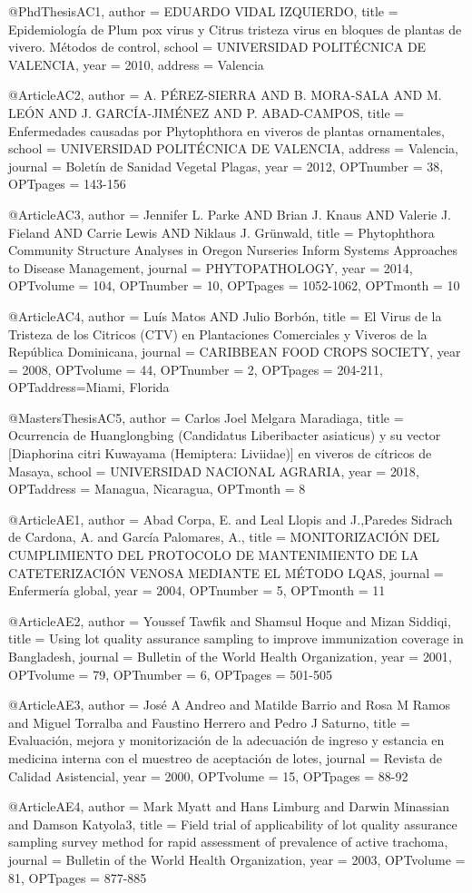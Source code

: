 @PhdThesis{AC1,
author = {EDUARDO VIDAL IZQUIERDO},
title = {Epidemiología de Plum pox virus y Citrus tristeza virus en bloques de plantas de vivero. Métodos de control},
school = {UNIVERSIDAD POLITÉCNICA DE VALENCIA},
year = {2010},
address = {Valencia}
}

@Article{AC2,
author = {A. PÉREZ-SIERRA AND B. MORA-SALA AND M. LEÓN AND J. GARCÍA-JIMÉNEZ AND P. ABAD-CAMPOS},
title = {Enfermedades causadas por Phytophthora en viveros de plantas ornamentales},
school = {UNIVERSIDAD POLITÉCNICA DE VALENCIA},
address = {Valencia},
journal = {Boletín de Sanidad Vegetal Plagas},
year = {2012},
OPTnumber = {38},
OPTpages = {143-156}
}

@Article{AC3,
author = {Jennifer L. Parke AND Brian J. Knaus AND Valerie J. Fieland AND Carrie Lewis AND Niklaus J. Grünwald},
title = {Phytophthora Community Structure Analyses in Oregon Nurseries Inform Systems Approaches to Disease Management},
journal = {PHYTOPATHOLOGY},
year = {2014},
OPTvolume = {104},
OPTnumber = {10},
OPTpages = {1052-1062},
OPTmonth = {10}
}

@Article{AC4,
author = {Luís Matos AND Julio Borbón},
title = {El Virus de la Tristeza de los Citricos (CTV) en Plantaciones Comerciales y Viveros de la República Dominicana},
journal = {CARIBBEAN FOOD CROPS SOCIETY},
year = {2008},
OPTvolume = {44},
OPTnumber = {2},
OPTpages = {204-211},
OPTaddress={Miami, Florida}
}

@MastersThesis{AC5,
author = {Carlos Joel Melgara Maradiaga},
title = {Ocurrencia de Huanglongbing (Candidatus Liberibacter asiaticus) y su vector [Diaphorina citri Kuwayama (Hemiptera: Liviidae)] en viveros de cítricos de Masaya},
school = {UNIVERSIDAD NACIONAL AGRARIA},
year = {2018},
OPTaddress = {Managua, Nicaragua},
OPTmonth = {8}
}

@Article{AE1,
author = {Abad Corpa, E. and Leal Llopis and J.,Paredes Sidrach de Cardona, A. and García Palomares, A.},
title = {MONITORIZACIÓN DEL CUMPLIMIENTO DEL PROTOCOLO DE MANTENIMIENTO DE LA CATETERIZACIÓN VENOSA MEDIANTE EL MÉTODO LQAS},
journal = {Enfermería global},
year = {2004},
OPTnumber = {5},
OPTmonth = {11}
}

@Article{AE2,
author = {Youssef Tawfik and Shamsul Hoque and Mizan Siddiqi},
title = {Using lot quality assurance sampling to improve immunization coverage in Bangladesh},
journal = {Bulletin of the World Health Organization},
year = {2001},
OPTvolume = {79},
OPTnumber = {6},
OPTpages = {501-505}
}

@Article{AE3,
author = {José A Andreo and Matilde Barrio and Rosa M Ramos and Miguel Torralba and Faustino Herrero and Pedro J Saturno},
title = {Evaluación, mejora y monitorización de la adecuación de ingreso y estancia en medicina interna con el muestreo de aceptación de lotes},
journal = {Revista de Calidad Asistencial},
year = {2000},
OPTvolume = {15},
OPTpages = {88-92}
}

@Article{AE4,
author = {Mark Myatt and Hans Limburg and Darwin Minassian and Damson Katyola3},
title = {Field trial of applicability of lot quality assurance sampling survey method for rapid assessment of prevalence of active trachoma},
journal = {Bulletin of the World Health Organization},
year = {2003},
OPTvolume = {81},
OPTpages = {877-885}
}
